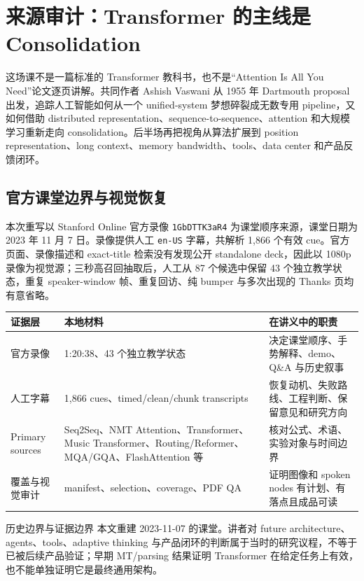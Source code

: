 \documentclass[a4paper]{article}
\begin{document}
\makecscover

\section{来源审计：Transformer 的主线是 Consolidation}

这场课不是一篇标准的 Transformer 教科书，也不是“Attention Is All You Need”论文逐页讲解。共同作者 Ashish Vaswani 从 1955 年 Dartmouth proposal 出发，追踪人工智能如何从一个 unified-system 梦想碎裂成无数专用 pipeline，又如何借助 distributed representation、sequence-to-sequence、attention 和大规模学习重新走向 consolidation。后半场再把视角从算法扩展到 position representation、long context、memory bandwidth、tools、data center 和产品反馈闭环。

\subsection{官方课堂边界与视觉恢复}

本次重写以 Stanford Online 官方录像 \texttt{1GbDTTK3aR4} 为课堂顺序来源，课堂日期为 2023 年 11 月 7 日。录像提供人工 \texttt{en-US} 字幕，共解析 1,866 个有效 cue。官方页面、录像描述和 exact-title 检索没有发现公开 standalone deck，因此以 1080p 录像为视觉源；三秒高召回抽取后，人工从 87 个候选中保留 43 个独立教学状态，重复 speaker-window 帧、重复回访、纯 bumper 与多次出现的 Thanks 页均有意省略。

\begin{longtable}{@{}L{0.18\textwidth}L{0.31\textwidth}L{0.40\textwidth}@{}}
\toprule
证据层 & 本地材料 & 在讲义中的职责 \\
\midrule
官方录像 & 1:20:38、43 个独立教学状态 & 决定课堂顺序、手势解释、demo、Q\&A 与历史叙事 \\
人工字幕 & 1,866 cues、timed/clean/chunk transcripts & 恢复动机、失败路线、工程判断、保留意见和研究方向 \\
Primary sources & Seq2Seq、NMT Attention、Transformer、Music Transformer、Routing/Reformer、MQA/GQA、FlashAttention 等 & 核对公式、术语、实验对象与时间边界 \\
覆盖与视觉审计 & manifest、selection、coverage、PDF QA & 证明图像和 spoken nodes 有计划、有落点且成品可读 \\
\bottomrule
\end{longtable}

\begin{warningbox}{历史边界与证据边界}
本文重建 2023-11-07 的课堂。讲者对 future architecture、agents、tools、adaptive thinking 与产品闭环的判断属于当时的研究议程，不等于已被后续产品验证；早期 MT/parsing 结果证明 Transformer 在给定任务上有效，也不能单独证明它是最终通用架构。
\end{warningbox}
\end{document}
